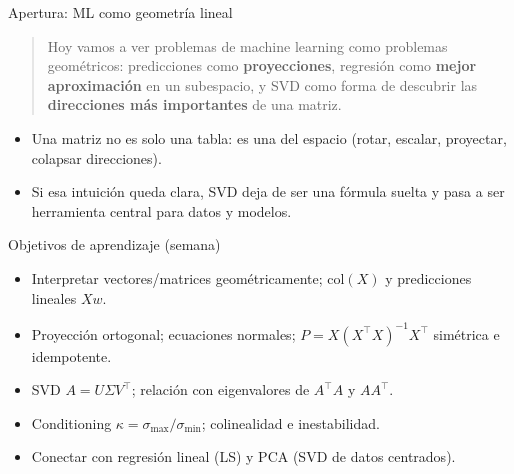 \begin{frame}{Apertura: ML como geometría lineal}
\begin{quote}\small
Hoy vamos a ver problemas de machine learning como problemas geométricos: predicciones como \textbf{proyecciones}, regresión como \textbf{mejor aproximación} en un subespacio, y SVD como forma de descubrir las \textbf{direcciones más importantes} de una matriz.
\end{quote}
\vspace{0.5em}
\begin{itemize}\small
  \item Una matriz no es solo una tabla: es una  del espacio (rotar, escalar, proyectar, colapsar direcciones).
  \item Si esa intuición queda clara, SVD deja de ser una fórmula suelta y pasa a ser herramienta central para datos y modelos.
\end{itemize}
\end{frame}

\begin{frame}{Objetivos de aprendizaje (semana)}
\begin{itemize}\footnotesize
  \item Interpretar vectores/matrices geométricamente; \(\mathrm{col}(X)\) y predicciones lineales \(Xw\).
  \item Proyección ortogonal; ecuaciones normales; \(P=X(X^\top X)^{-1}X^\top\) simétrica e idempotente.
  \item SVD \(A=U\Sigma V^\top\); relación con eigenvalores de \(A^\top A\) y \(AA^\top\).
  \item Conditioning \(\kappa=\sigma_{\max}/\sigma_{\min}\); colinealidad e inestabilidad.
  \item Conectar con regresión lineal (LS) y PCA (SVD de datos centrados).
\end{itemize}
\end{frame}

